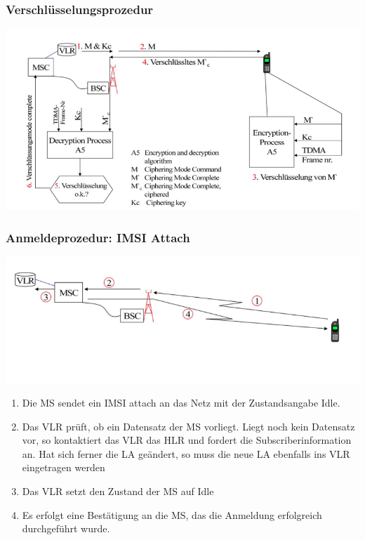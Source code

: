\subsubsection{Verschlüsselungsprozedur}
\includegraphics[width =  0.5 \linewidth]{./Pics/GSMVerschluesselung} 

\subsubsection{Anmeldeprozedur: IMSI Attach}
\begin{minipage}{0.5 \linewidth}
\includegraphics[width = \linewidth]{./Pics/GSMIMSIAttach}
\end{minipage}
\begin{minipage}{0.5 \linewidth}
\begin{enumerate}
\item Die MS sendet ein IMSI attach an das Netz mit der Zustandsangabe Idle.
\item Das VLR prüft, ob ein Datensatz der MS vorliegt. Liegt noch kein Datensatz vor, so kontaktiert das VLR das HLR und fordert die Subscriberinformation an. Hat sich ferner die LA geändert, so muss die neue LA ebenfalls ins VLR eingetragen werden
\item Das VLR setzt den Zustand der MS auf Idle
\item Es erfolgt eine Bestätigung an die MS, das die Anmeldung erfolgreich durchgeführt wurde.
\end{enumerate}
\end{minipage}

